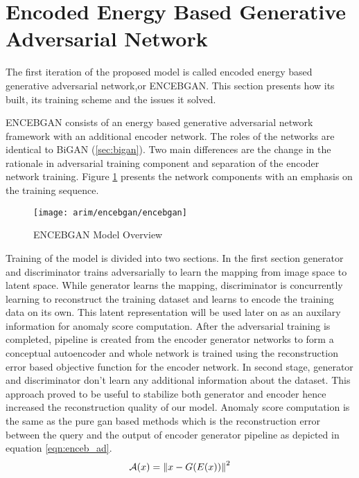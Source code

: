 \section{Encoded Energy Based Generative Adversarial Network}
\label{sec:encebgan}

The first iteration of the proposed model is called encoded energy based generative adversarial
network,or ENCEBGAN. This section presents how its built, its training scheme and the issues it
solved.

ENCEBGAN consists of an energy based generative adversarial network framework with an additional
encoder network. The roles of the networks are identical to BiGAN (\ref{sec:bigan}). Two main
differences are the change in the rationale in adversarial training component and separation of the
encoder network training. Figure \ref{fig:encebgan_model} presents the network components with an
emphasis on the training sequence.
\begin{figure}[h!]
	\centering
	\texttt{[image: arim/encebgan/encebgan]}
	\caption{ENCEBGAN Model Overview }
	\label{fig:encebgan_model}
\end{figure}

Training of the model is divided into two sections. In the first section generator and discriminator
trains adversarially to learn the mapping from image space to latent space. While generator learns
the mapping, discriminator is concurrently learning to reconstruct the training dataset and learns
to encode the training data on its own. This latent representation will be used later on as an
auxilary information for anomaly score computation. After the adversarial training is completed,
pipeline is created from the encoder generator networks to form a conceptual autoencoder and whole
network is trained using the reconstruction error based objective function for the encoder network.
In second stage, generator and discriminator don't learn any additional information about the
dataset. This approach proved to be useful to stabilize both generator and encoder hence increased
the reconstruction quality of our model. Anomaly score computation is the same as the pure gan based
methods which is the reconstruction error between the query and the output of encoder generator
pipeline as depicted in equation \ref{eqn:enceb_ad}. 
\begin{equation}
	\label{eqn:enceb_ad}
	\mathcal{A}(x) = \left\lVert x - G(E(x))\right\rVert^2
\end{equation}

